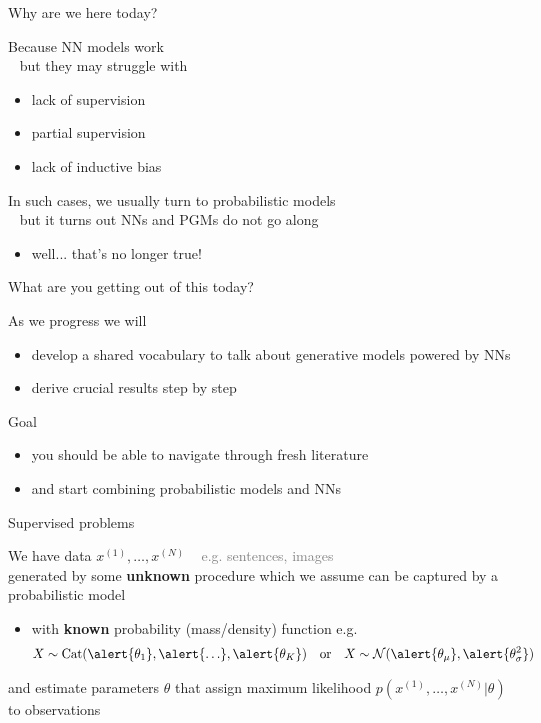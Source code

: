 


\begin{frame}{Why are we here today?}

Because NN models work \\ \pause
~ but they may struggle with
\begin{itemize}
	\item lack of supervision
	\item partial supervision
	\item lack of inductive bias
\end{itemize}
\pause

In such cases, we usually turn to probabilistic models \\ \pause
~ but it turns out NNs and PGMs do not go along
\begin{itemize}
	\item well... \pause that's no longer true!
\end{itemize}

\end{frame}

\begin{frame}{What are you getting out of this today?}

As we progress we will
\begin{itemize}
	\item develop a shared vocabulary to talk about generative models powered by NNs
	\item derive crucial results step by step
\end{itemize}

\pause

Goal
\begin{itemize}
	\item you should be able to navigate through fresh literature
	\item and start combining probabilistic models and NNs
\end{itemize}

\end{frame}




\begin{frame}{Supervised problems}

We have data $x^{(1)}, \ldots,  x^{(N)}$ \textcolor{gray}{~ e.g. sentences, images} \\
generated by some {\bf unknown} procedure 
which we assume can be captured by a probabilistic model


\begin{itemize}
	\item with {\bf known} probability (mass/density) function e.g.
	\begin{align*}
    X \sim \Cat(\alert{\theta_1}, \alert{\ldots}, \alert{\theta_K}) & & \text{or} & & X \sim \mathcal N(\alert{\theta_\mu}, \alert{\theta^2_\sigma})
    \end{align*}    
\end{itemize}
\pause
and \alert{estimate parameters $\theta$}  that assign maximum likelihood $p(x^{(1)}, \ldots, x^{(N)}|\theta)$ to observations

\end{frame}


